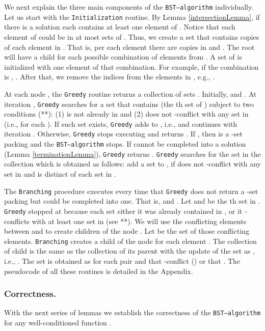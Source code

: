 We next explain the three main components of the \texttt{BST--algorithm} individually. Let us start with the \texttt{Initialization} routine. By Lemma \ref{intersectionLemma}, if there is a solution  each  contains at least one element of . 
Notice that each element of  could be in at most  sets of . 
Thus, we create a set  that contains  copies of each element in . That is, per each element  there are  copies  in  and . The root will have a child  for each possible combination of  elements from . A set of  is initialized with one element of that combination. For example, if the combination is , . After that, we remove the indices from the elements in , e.g., . 

At each node , the \texttt{Greedy} routine returns a collection of sets . 
Initially,  and . 
At iteration , \texttt{Greedy} searches for a set  that contains  (the th set of ) subject to two conditions (**): (1)  is not already in  and (2)  does not -conflict with any set in  (i.e.,  for each ). 
If such set  exists, \texttt{Greedy} adds  to , i.e.,  and  continues with iteration . 
Otherwise, \texttt{Greedy} stops executing and returns .
If , then  is a -set packing and the \texttt{BST--algorithm} stops.
If  cannot be completed into a solution (Lemma \ref{terminationLemma}), \texttt{Greedy} returns .
\texttt{Greedy} searches for the set  in the collection  which is obtained as follows: add a set  to , if  does not -conflict with any set in  and  is distinct of each set in .

The \texttt{Branching} procedure executes every time that \texttt{Greedy} does not return a -set packing but  could be completed into one. That is,  and  .
Let  and  be the th set in . 
\texttt{Greedy} stopped at  because each set  either it was already contained in , or  it -conflicts with at least one set in  (see **). 
We will use the conflicting elements between  and  to create children of the node .
Let  be the set of those conflicting elements. 
\texttt{Branching} creates a child  of the node  for each element . The collection  of child  is the same as the collection  of its parent  with the update of the set  as , i.e., . 
The set  is obtained as  for each pair  and  that -conflict () or that . The pseudocode of all these routines is detailed in the Appendix. 

\subsubsection{Correctness.}

With the next series of lemmas we establish the correctness of the \texttt{BST--algorithm} for any well-conditioned function .


